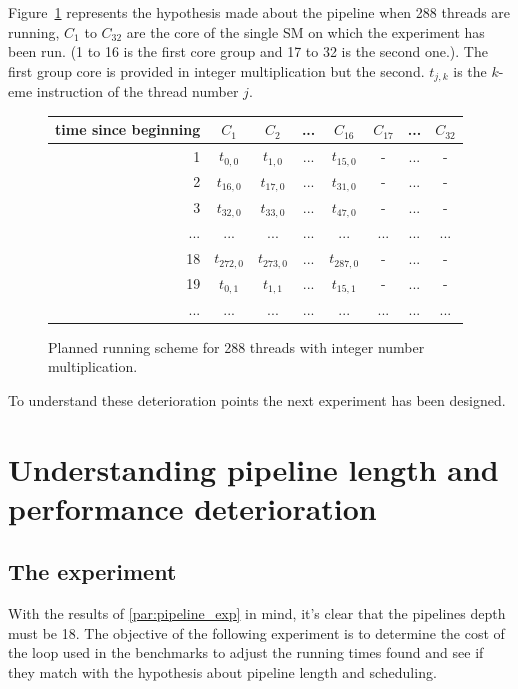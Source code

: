 \documentclass{report}
\begin{document}
    Figure~\ref{fig:int_prediction_256} represents the hypothesis made about the pipeline when 288
    threads are running, $C_1$ to $C_{32}$ are the core of the single SM on which the experiment
    has been run. (1 to 16 is the first core group and 17 to 32 is the second one.). The first
    group core is provided in integer multiplication but the second. $t_{j,k}$ is the $k$-eme instruction of the thread number
    $j$.
   \begin{figure}[H]
      \centering
       \begin{tabular}{ | r || c | c | c | c || c | c | c | }
    	    \hline
    	    time since beginning & $C_1$ & $C_2$ & ... & $C_{16}$ & $C_{17}$ & ... & $C_{32}$ \\ \hline  \hline
    	   1 & $t_{0,0}$ & $t_{1,0}$ & ... & $t_{15,0}$ & - & ... & - \\ \hline 
    	   2 & $t_{16,0}$ & $t_{17,0}$ & ... & $t_{31,0}$ & - & ... & - \\ \hline
    	   3 & $t_{32,0}$ & $t_{33,0}$ & ... & $t_{47,0}$ & - & ... & - \\ \hline
    	   ... & ... & ... & ... & ... & ... & ... & ... \\ \hline
    	   18 & $t_{272,0}$ & $t_{273,0}$ & ... & $t_{287,0}$ & - & ... & - \\ \hline
    	   19 & $t_{0,1}$ & $t_{1,1}$ & ... & $t_{15,1}$ & - & ... & - \\ \hline
    	   ... & ... & ... & ... & ... & ... & ... & ... \\ \hline
  	\end{tabular}
  	\captionsetup{justification=centering}
  	\caption{Planned running scheme for 288 threads with integer number multiplication.}
  	\label{fig:int_prediction_256}
   \end{figure}

    To understand these deterioration points the next experiment has been designed.

\section{Understanding pipeline length and performance deterioration}
    \subsection{The experiment}
    With the results of \ref{par:pipeline_exp} in mind, it's clear that the pipelines depth 
    must be 18. The objective of the following experiment is to determine the cost of
    the loop used in the benchmarks to adjust the running times found and see if they match with
    the hypothesis about pipeline length and scheduling. 
\end{document}
